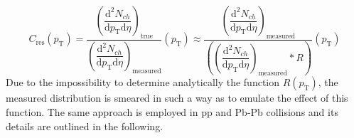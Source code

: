 \documentclass[12pt,a4paper]{report}
\begin{document}
\begin{equation} 
  C_{\text{res}}(p_{\text{T}}) = \dfrac{\left(\dfrac{\text{d}^2 N_{ch}}{\text{d}p_{\text{T}} \text{d}\eta} \right)_{\text{true}}}{\left(\dfrac{\text{d}^2 N_{ch}}{\text{d}p_{\text{T}} \text{d}\eta} \right)_{\text{measured}}}(p_{\text{T}})  \approx \dfrac{ \left(\dfrac{\text{d}^2 N_{ch}}{\text{d}p_{\text{T}} \text{d}\eta} \right)_{\text{measured}} }{\left(\left(\dfrac{\text{d}^2 N_{ch}}{\text{d}p_{\text{T}} \text{d}\eta} \right)_{\text{measured}} *R \right)}(p_{\text{T}}) 
\end{equation}
Due to the impossibility to determine analytically the function $R(p_\text{T})$, the measured \pt distribution is smeared in such a way as to emulate the effect of this function. The same approach is employed in pp and Pb-Pb collisions and its details are outlined in the following.
\end{document}
